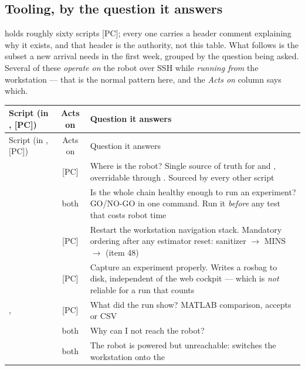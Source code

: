 \subsection{Tooling, by the question it answers}
\label{ap:repro-inv-tools}

 holds roughly sixty scripts [PC]; every one carries a header
comment explaining why it exists, and that header is the authority, not this
table. What follows is the subset a new arrival needs in the first week,
grouped by the question being asked. Several of these \emph{operate on} the
robot over SSH while \emph{running from} the workstation --- that is the
normal pattern here, and the \emph{Acts on} column says which.

\begin{longtable}{@{}L{4.8cm}cL{7.2cm}@{}}
\toprule
Script (in , [PC]) & Acts on & Question it answers \\
\midrule
\endfirsthead
\toprule
Script (in , [PC]) & Acts on & Question it answers \\
\midrule
\endhead
{} & [PC] &
  Where is the robot? Single source of truth for  and
  , overridable through .
  Sourced by every other script \\
\addlinespace
{} & both &
  Is the whole chain healthy enough to run an experiment? GO/NO-GO in one
  command. Run it \emph{before} any test that costs robot time \\
\addlinespace
{} & [PC] &
  Restart the workstation navigation stack. Mandatory ordering after any
  estimator reset: sanitizer $\rightarrow$ MINS $\rightarrow$
   (item 48) \\
\addlinespace
{} & [PC] &
  Capture an experiment properly. Writes a rosbag to disk, independent of the
  web cockpit --- which is \emph{not} reliable for a run that counts \\
\addlinespace
{}, \newline {} & [PC] &
  What did the run show? MATLAB comparison, accepts  or CSV \\
\addlinespace
{} & both &
  Why can I not reach the robot? \\
\addlinespace
{} & both &
  The robot is powered but unreachable: switches the workstation onto the

\end{longtable}
